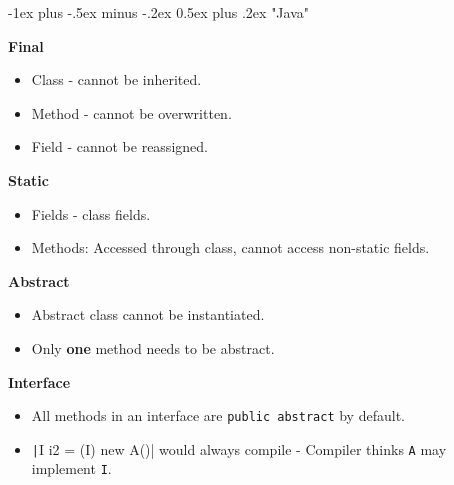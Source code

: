 \documentclass[10pt, landscape]{article}
\makeatletter
\renewcommand{\section}{\@startsection{section}{1}{0mm}%
                                {-1ex plus -.5ex minus -.2ex}%
                                {0.5ex plus .2ex}%
                                {\normalfont\large\bfseries}}
\newcommand{\code}[1]{\textcolor{mygreen}{\texttt{#1}}}
\newcommand{\java}[1]{\texttt|#1|}
\makeatother
\begin{document}
\raggedright
\footnotesize
\begin{multicols}{2}

\setlength{\columnseprule}{0.25pt} %
\setlength{\premulticols}{1pt}
\setlength{\postmulticols}{1pt}
\setlength{\multicolsep}{1pt}
\setlength{\columnsep}{2pt}

\begin{center}
\end{center}

\section{"Java"}
\begin{multicols}{2}

\textbf{Final}
\begin{itemize}
    \item Class - cannot be inherited.
    \item Method - cannot be overwritten.
    \item Field - cannot be reassigned.
\end{itemize}

\textbf{Static}
\begin{itemize}
    \item Fields - class fields.
    \item Methods: Accessed through class, cannot access non-static fields. 
\end{itemize}

\columnbreak{}

\textbf{Abstract}
\begin{itemize}
    \item Abstract class cannot be instantiated.
    \item Only \textbf{one} method needs to be abstract. 
\end{itemize}

\textbf{Interface}
\begin{itemize}
    \item All methods in an interface are \code{public abstract} by default.
    \item \java{I i2 = (I) new A()} would always compile - Compiler thinks \code{A} may implement \code{I}. 
\end{itemize} 
\end{multicols}


\end{multicols}
\end{document}
